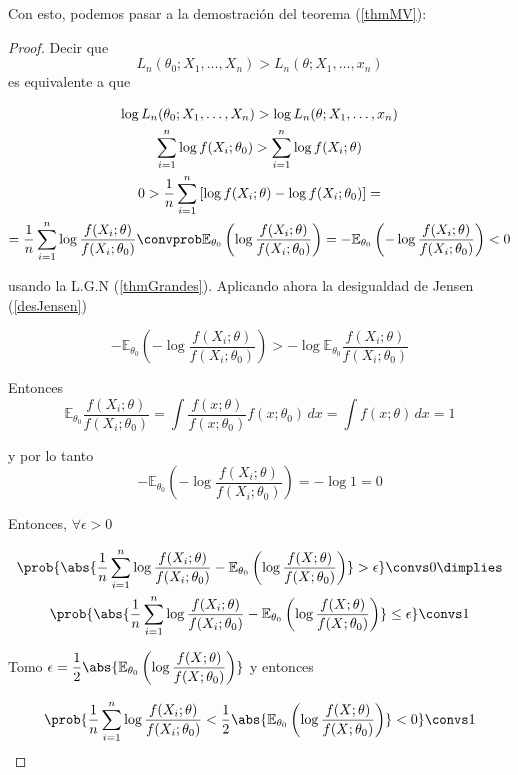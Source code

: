 \documentclass{apuntes}
\begin{document}
Con esto, podemos pasar a la demostración del teorema (\ref{thmMV}):

\begin{proof} Decir que \[ L_n(\theta_0;X_1, \dotsc, X_n) > L_n(\theta; X_1,\dotsc,x_n) \] es equivalente a que

\begin{gather*}
\log L_n(\theta_0;X_1, \dotsc, X_n) >\log L_n(\theta; X_1,\dotsc,x_n) \\
\sum_{i=1}^n \log f(X_i;\theta_0) > \sum_{i=1}^n \log f(X_i;\theta) \\
0 > \frac{1}{n}\sum_{i=1}^n \left[\log f(X_i;\theta) - \log f(X_i;\theta_0)\right] = \\
= \frac{1}{n}\sum_{i=1}^n \log \frac{f(X_i;\theta)}{f(X_i;\theta_0)}\convprob \mathbb{E}_{\theta_0}  \left(\log \frac{f(X_i;\theta)}{f(X_i;\theta_0)}\right) =  - \mathbb{E}_{\theta_0}  \left(-\log \frac{f(X_i;\theta)}{f(X_i;\theta_0)}\right) < 0
\end{gather*}

usando la L.G.N (\ref{thmGrandes}). Aplicando ahora la desigualdad  de Jensen (\ref{desJensen})

\[ - \mathbb{E}_{\theta_0}  \left(-\log \frac{f(X_i;\theta)}{f(X_i;\theta_0)}\right) > - \log  \mathbb{E}_{\theta_0}  \frac{f(X_i;\theta)}{f(X_i;\theta_0)} \]

Entonces \[  \mathbb{E}_{\theta_0}  \frac{f(X_i;\theta)}{f(X_i;\theta_0)} = \int \frac{f(x;\theta)}{f(x;\theta_0)} f(x;\theta_0) \,dx = \int f(x;\theta)\, dx = 1 \]

y por lo tanto  \[ - \mathbb{E}_{\theta_0}  \left(-\log \frac{f(X_i;\theta)}{f(X_i;\theta_0)}\right) = - \log 1 = 0 \]

Entonces, $\forall \epsilon > 0$

\begin{gather*}\prob{\abs{\frac{1}{n} \sum_{i=1}^n \log \frac{f(X_i;\theta)}{f(X_i;\theta_0)} - \mathbb{E}_{\theta_0}\left(\log \frac{f(X;\theta)}{f(X;\theta_0)}\right)} > \epsilon} \convs 0 \dimplies \\
\prob{\abs{\frac{1}{n} \sum_{i=1}^n \log \frac{f(X_i;\theta)}{f(X_i;\theta_0)} - \mathbb{E}_{\theta_0}\left(\log \frac{f(X;\theta)}{f(X;\theta_0)}\right)} \leq \epsilon} \convs 1
\end{gather*}

Tomo $\displaystyle \epsilon = \frac{1}{2}\abs{\mathbb{E}_{\theta_0}\left(\log \frac{f(X;\theta)}{f(X;\theta_0)}\right)}$ y entonces

\[ \prob{\frac{1}{n}\sum_{i=1}^n\log\frac{f(X_i;\theta)}{f(X_i;\theta_0)}  <  \frac{1}{2}\abs{\mathbb{E}_{\theta_0}\left(\log \frac{f(X;\theta)}{f(X;\theta_0)}\right)} < 0 } \convs 1 \]
\end{proof}
\end{document}
